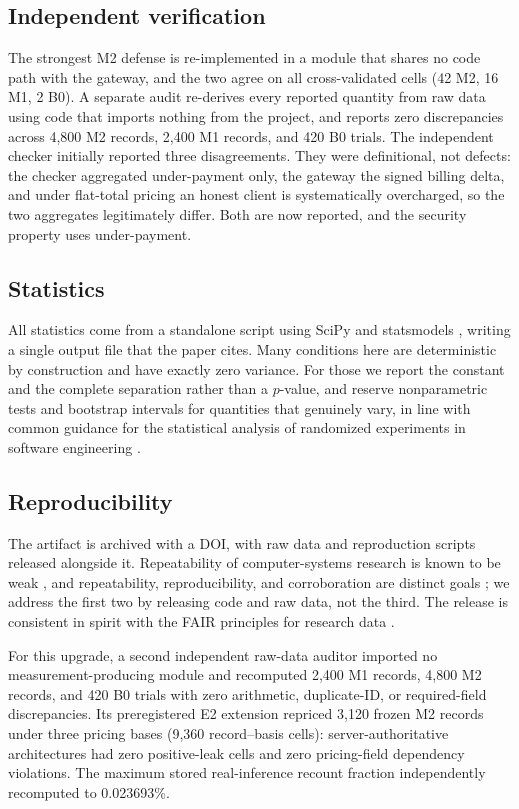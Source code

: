 \documentclass[manuscript,review,anonymous]{acmart}
\begin{document}
\subsection{Independent verification}
The strongest M2 defense is re-implemented in a module that shares no code path with the
gateway, and the two agree on all cross-validated cells (42 M2, 16 M1, 2 B0). A separate
audit re-derives every reported quantity from raw data using code that imports nothing
from the project, and reports zero discrepancies across 4{,}800 M2 records, 2{,}400 M1
records, and 420 B0 trials. The independent checker initially reported three
disagreements. They were definitional, not defects: the checker aggregated under-payment
only, the gateway the signed billing delta, and under flat-total pricing an honest client
is systematically overcharged, so the two aggregates legitimately differ. Both are now
reported, and the security property uses under-payment.

\subsection{Statistics}
All statistics come from a standalone script using SciPy \citep{scipy} and statsmodels
\citep{statsmodels}, writing a
single output file that the paper cites. Many conditions here are deterministic by
construction and have exactly zero variance. For those we report the constant and the
complete separation rather than a $p$-value, and reserve nonparametric tests and
bootstrap intervals \citep{efron} for quantities that genuinely vary, in line with common
guidance for the statistical analysis of randomized experiments in software engineering
\citep{arcuri}.

\subsection{Reproducibility}
The artifact is archived with a DOI, with raw data and reproduction scripts released
alongside it. Repeatability of computer-systems research is known to be weak
\citep{collberg}, and repeatability, reproducibility, and corroboration are distinct
goals \citep{feitelson}; we address the first two by releasing code and raw data, not the
third. The release is consistent in spirit with the FAIR principles for research data
\citep{fair}.

For this upgrade, a second independent raw-data auditor imported no measurement-producing
module and recomputed 2{,}400 M1 records, 4{,}800 M2 records, and 420 B0 trials with zero
arithmetic, duplicate-ID, or required-field discrepancies. Its preregistered E2 extension
repriced 3{,}120 frozen M2 records under three pricing bases (9{,}360 record--basis cells):
server-authoritative architectures had zero positive-leak cells and zero pricing-field
dependency violations. The maximum stored real-inference recount fraction independently
recomputed to 0.023693\%.
\end{document}
